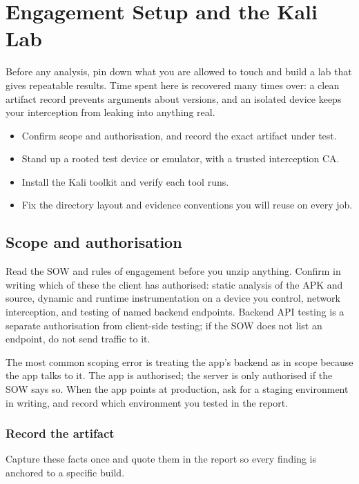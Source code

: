 \chapter{Engagement Setup and the Kali Lab}\label{ch:setup}

Before any analysis, pin down what you are allowed to touch and build a lab that gives repeatable results. Time spent here is recovered many times over: a clean artifact record prevents arguments about versions, and an isolated device keeps your interception from leaking into anything real.

\begin{objectives}
\begin{itemize}[leftmargin=12pt]
\item Confirm scope and authorisation, and record the exact artifact under test.
\item Stand up a rooted test device or emulator, with a trusted interception CA.
\item Install the Kali toolkit and verify each tool runs.
\item Fix the directory layout and evidence conventions you will reuse on every job.
\end{itemize}
\end{objectives}

\section{Scope and authorisation}
Read the SOW and rules of engagement before you unzip anything. Confirm in writing which of these the client has authorised: static analysis of the APK and source, dynamic and runtime instrumentation on a device you control, network interception, and testing of named backend endpoints. Backend API testing is a separate authorisation from client-side testing; if the SOW does not list an endpoint, do not send traffic to it.

\begin{trap}
The most common scoping error is treating the app's backend as in scope because the app talks to it. The app is authorised; the server is only authorised if the SOW says so. When the app points at production, ask for a staging environment in writing, and record which environment you tested in the report.
\end{trap}

\subsection{Record the artifact}
Capture these facts once and quote them in the report so every finding is anchored to a specific build.

